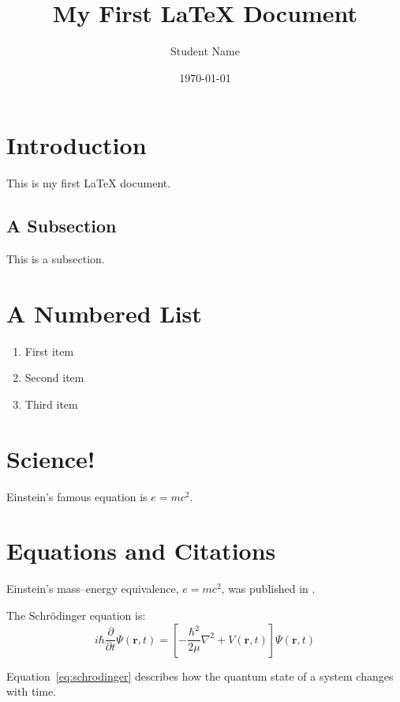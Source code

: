 \documentclass[12pt, a4paper]{article}
\title{My First \LaTeX{} Document}
\author{Student Name}
\date{\today}
\begin{document}
\maketitle
\section{Introduction}
This is my first \LaTeX{} document.

\subsection{A Subsection}
This is a subsection.

\section{A Numbered List}
\begin{enumerate}
  \item First item
  \item Second item
  \item Third item
\end{enumerate}

\section{Science!}
Einstein's famous equation is $e = mc^{2}$.
\section{Equations and Citations}

Einstein's mass--energy equivalence, $e = mc^{2}$, was published in \citet{einstein1905}.

The Schr\"{o}dinger equation \citep{schrodinger1926} is:
\begin{equation}
  \label{eq:schrodinger}
  i\hbar \frac{\partial}{\partial t} \Psi(\mathbf{r}, t)
  = \left[ -\frac{\hbar^{2}}{2\mu} \nabla^{2} + V(\mathbf{r}, t) \right]
  \Psi(\mathbf{r}, t)
\end{equation}

Equation~\ref{eq:schrodinger} describes how the quantum state of a system changes with time.



\end{document}
